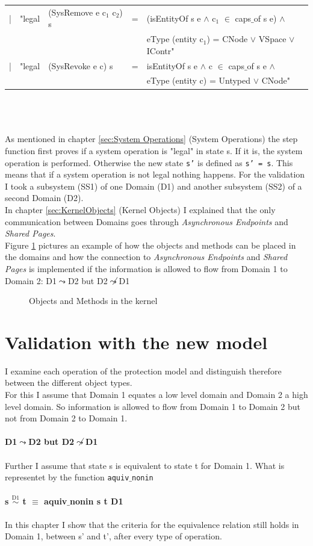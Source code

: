 \documentclass[11pt,a4paper,twoside]{article}
\begin{document}
{{{\begin{tabular}{lllll}
	| 	&	"legal 	&	(SysRemove e c$_1$ c$_2$) s	&  =	& (isEntityOf s e $\wedge$ c$_1$ $\in$ caps$\_$of s e)  $\wedge$ \\ & & & & eType (entity c$_1$) = CNode $\vee$ VSpace $\vee$ IContr" \\
	|	&	"legal	&	(SysRevoke e c) s	&	=	&	isEntityOf s e $\wedge$ c $\in$ caps$\_$of s e  $\wedge$ \\ & & & & eType (entity c) = Untyped $\vee$ CNode"
	\end{tabular}}} \\ \\ \\
	As mentioned in chapter \ref{sec:System Operations} (System Operations) the step function first proves if a system operation is "legal" in state s. If it is, the system operation is performed. Otherwise the new state \texttt{s'} is defined as \texttt{s' = s}. This means that if a system operation is not legal nothing happens. 
For the validation I took a subsystem (SS1) of one Domain (D1) and another subsystem (SS2) of a second Domain (D2). \\
In chapter \ref{sec:KernelObjects} (Kernel Objects) I explained that the only communication between Domains goes through \textit{Asynchronous Endpoints} and \textit{Shared Pages}. \\
Figure \ref{overview} pictures an example of how the objects and methods can be placed in the domains and how the connection to \textit{Asynchronous Endpoints} and \textit{Shared Pages} is implemented if the information is allowed to flow from Domain 1 to Domain 2: D1$\leadsto$D2 but D2$\not\leadsto$D1
\begin{figure}[H]
\caption{Objects and Methods in the kernel}
\label{overview}
\end{figure}
\newpage
\section{Validation with the new model}\label{sec:ValNew}
I examine each operation of the protection model and distinguish therefore between the different object types. \\
For this I assume that Domain 1 equates a low level domain and Domain 2 a high level domain. So  information is allowed to flow from Domain 1 to Domain 2 but not from Domain 2 to Domain 1. \\ \\
\textbf{D1$\leadsto$D2 but D2$\not\leadsto$D1} \\ \\
Further I assume that state s is equivalent to state t for Domain 1. What is representet by the function  \texttt{aquiv$\_$nonin} \\ \\
\textbf{s $\overset{\text{D1}}{\sim}$ t $\equiv$ aquiv$\_$nonin s t D1}	\\ \\
In this chapter I show that the criteria for the equivalence relation still holds in Domain 1, between s' and t', after every type of operation. 
}
\end{document}
